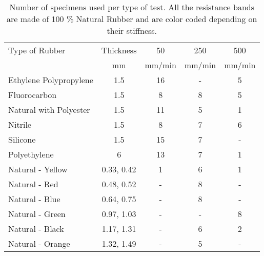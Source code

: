\begin{table}[htb!]
    \centering
    \caption{Number of specimens used per type of test. All the resistance bands are made of 100 \% Natural Rubber and are color coded depending on their stiffness.}
    \begin{tabular}{lcccc}
    \toprule
    Type of Rubber & Thickness &  50 & 250 & 500\\
     & mm & mm/min & mm/min & mm/min \\
    \hline
    Ethylene Polypropylene   &  1.5 & 16 & - & 5\\
    Fluorocarbon              &  1.5 & 8 & 8 & 5\\
    Natural with Polyester   &  1.5 & 11 & 5 & 1\\
    Nitrile                   &  1.5 & 8 & 7 & 6\\
    Silicone                  &  1.5 & 15 & 7 & -\\
    Polyethylene              &  6 & 13 & 7 & 1\\
    \hline
    Natural - Yellow  & 0.33, 0.42 & 1 & 6 & 1\\
    Natural - Red  & 0.48, 0.52 & - & 8 & -\\
    Natural - Blue  & 0.64, 0.75 & - & 8 & -\\
    Natural - Green  & 0.97, 1.03 & - & - & 8\\
    Natural - Black  & 1.17, 1.31 & - & 6 & 2\\
    Natural - Orange  & 1.32, 1.49 & - & 5 & -\\
    \bottomrule
    \end{tabular}
    \label{tbl:tensile_tests}
\end{table}

